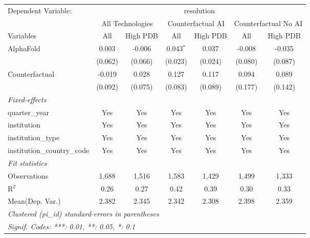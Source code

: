 \begingroup
\centering
\begin{tabular}{lcccccc}
   \tabularnewline \midrule \midrule
   Dependent Variable: & \multicolumn{6}{c}{resolution}\\
 & \multicolumn{2}{c}{All Technologies} & \multicolumn{2}{c}{Counterfactual AI} & \multicolumn{2}{c}{Counterfactual No AI} \\
\cmidrule(lr){1-1}\cmidrule(lr){2-3} \cmidrule(lr){4-5} \cmidrule(lr){6-7}
Variables & \multicolumn{1}{c}{All} & \multicolumn{1}{c}{High PDB} & \multicolumn{1}{c}{All} & \multicolumn{1}{c}{High PDB} & \multicolumn{1}{c}{All} & \multicolumn{1}{c}{High PDB} \\
\cmidrule(lr){1-1}\cmidrule(lr){2-2} \cmidrule(lr){3-3} \cmidrule(lr){4-4} \cmidrule(lr){5-5} \cmidrule(lr){6-6} \cmidrule(lr){7-7}
   AlphaFold                    & 0.003   & -0.006  & 0.043$^{*}$ & 0.037   & -0.008  & -0.035\\   
                                & (0.062) & (0.066) & (0.023)     & (0.024) & (0.080) & (0.087)\\   
   Counterfactual               & -0.019  & 0.028   & 0.127       & 0.117   & 0.094   & 0.089\\   
                                & (0.092) & (0.075) & (0.083)     & (0.089) & (0.177) & (0.142)\\   
   \midrule
   \emph{Fixed-effects}\\
   quarter\_year                & Yes     & Yes     & Yes         & Yes     & Yes     & Yes\\  
   institution                  & Yes     & Yes     & Yes         & Yes     & Yes     & Yes\\  
   institution\_type            & Yes     & Yes     & Yes         & Yes     & Yes     & Yes\\  
   institution\_country\_code   & Yes     & Yes     & Yes         & Yes     & Yes     & Yes\\  
   \midrule
   \emph{Fit statistics}\\
   Observations                 & 1,688   & 1,516   & 1,583       & 1,429   & 1,499   & 1,333\\  
   R$^2$                        & 0.26    & 0.27    & 0.42        & 0.39    & 0.30    & 0.33\\  
Mean(Dep. Var.) & 2.382 & 2.345 & 2.342 & 2.308 & 2.398 & 2.359 \\
   \midrule \midrule
   \multicolumn{7}{l}{\emph{Clustered (pi\_id) standard-errors in parentheses}}\\
   \multicolumn{7}{l}{\emph{Signif. Codes: ***: 0.01, **: 0.05, *: 0.1}}\\
\end{tabular}
\par\endgroup
